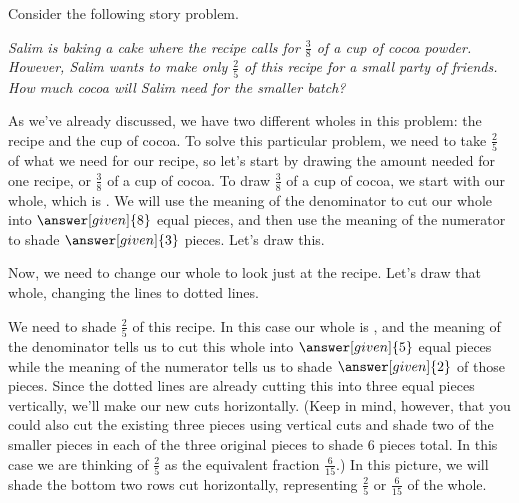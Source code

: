 \documentclass{ximera}
\begin{document}
\begin{example}
Consider the following story problem. 

\emph{Salim is baking a cake where the recipe calls for $\frac{3}{8}$ of a cup of cocoa powder. However, Salim wants to make only $\frac{2}{5}$ of this recipe for a small party of friends. How much cocoa will Salim need for the smaller batch?}

As we've already discussed, we have two different wholes in this problem: the recipe and the cup of cocoa. To solve this particular problem, we need to take $\frac{2}{5}$ of what we need for our recipe, so let's start by drawing the amount needed for one recipe, or $\frac{3}{8}$ of a cup of cocoa. To draw $\frac{3}{8}$ of a cup of cocoa, we start with our whole, which is . We will use the meaning of the denominator to cut our whole into $\answer[given]{8}$ equal pieces, and then use the meaning of the numerator to shade $\answer[given]{3}$ pieces. Let's draw this.

\begin{image}
\end{image}

Now, we need to change our whole to look just at the recipe. Let's draw that whole, changing the lines to dotted lines. 

\begin{image}
\end{image}

We need to shade $\frac{2}{5}$ of this recipe. In this case our whole is , and the meaning of the denominator tells us to cut this whole into $\answer[given]{5}$ equal pieces while the meaning of the numerator tells us to shade $\answer[given]{2}$ of those pieces. Since the dotted lines are already cutting this into three equal pieces vertically, we'll make our new cuts horizontally. (Keep in mind, however, that you could also cut the existing three pieces using vertical cuts and shade two of the smaller pieces in each of the three original pieces to shade $6$ pieces total. In this case we are thinking of $\frac{2}{5}$ as the equivalent fraction $\frac{6}{15}$.) In this picture, we will shade the bottom two rows cut horizontally, representing $\frac{2}{5}$ or $\frac{6}{15}$ of the whole.


\end{example}
\end{document}
